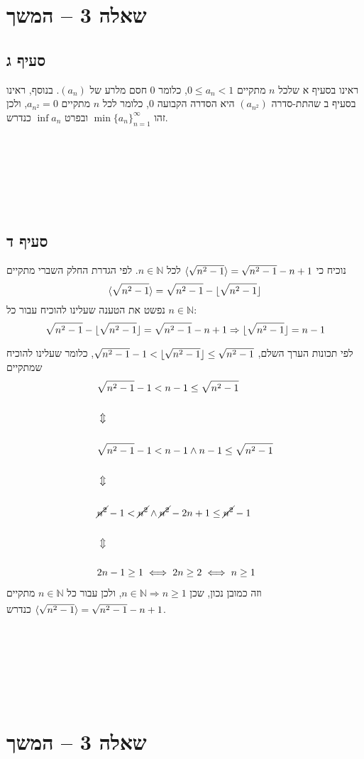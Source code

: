 \documentclass[11pt, oneside]{article}
\newcommand{\qed}{\R{$\blacksquare$}}
\newcommand{\br}{\\\\\\\\\\\\\\}
\newcommand{\logr}[1]{\underset{\text{#1}}{\Rightarrow}}
\newcommand{\mN}{\mathbb{N}}
\DeclarePairedDelimiter\floor{\lfloor}{\rfloor}
\DeclarePairedDelimiter\quo{\langle}{\rangle}
\begin{document}
\section*{שאלה 3 -- המשך}
\subsection*{סעיף ג}
ראינו בסעיף א שלכל $n$ מתקיים $0 \le a_{n} < 1$, כלומר 0 חסם מלרע של $(a_{n})$. בנוסף, ראינו בסעיף ב שהתת-סדרה $(a_{n^{2}})$ היא הסדרה הקבועה $0$, כלומר לכל $n$ מתקיים $a_{n^{2}} = 0$, ולכן זהו $\min{\{a_{n}\}^{\infty}_{n = 1}}$ ובפרט $\inf{a_{n}}$ כנדרש.
\br\qed

\subsection*{סעיף ד}
נוכיח כי $\quo{\sqrt{n^{2} - 1}} = \sqrt{n^{2} - 1} - n + 1$ לכל $n \in \mN$. לפי הגדרת החלק השברי מתקיים
\[\quo{\sqrt{n^{2} - 1}} = \sqrt{n^{2} - 1} - \floor{\sqrt{n^{2} - 1}}\]
נפשט את הטענה שעלינו להוכיח עבור כל $n \in \mN$:
\[
\sqrt{n^{2} - 1} - \floor{\sqrt{n^{2} - 1}} = \sqrt{n^{2} - 1} - n + 1 \logr{} \floor{\sqrt{n^{2} - 1}} = n - 1
\]
לפי תכונות הערך השלם, $\sqrt{n^{2} - 1} - 1 < \floor{\sqrt{n^{2} - 1}} \le \sqrt{n^{2} - 1}$, כלומר שעלינו להוכיח שמתקיים
\begin{eqnarray*}
& \sqrt{n^{2} - 1} - 1 < n - 1 \le \sqrt{n^{2} - 1}\\\\
& \Updownarrow\\\\
& \sqrt{n^{2} - 1} - 1 < n - 1 \land n - 1 \le \sqrt{n^{2} - 1}\\\\
& \Updownarrow\\\\
& \cancel{n^{2}} - 1 < \cancel{n^{2}} \land \cancel{n^{2}} - 2n + 1 \le \cancel{n^{2}} - 1\\\\
& \Updownarrow\\\\
& 2n - 1 \ge 1 \iff 2n \ge 2 \iff n \ge 1
\end{eqnarray*}
וזה כמובן נכון, שכן $n \in \mN \logr{} n \ge 1$, ולכן עבור כל $n \in \mN$ מתקיים $\quo{\sqrt{n^{2} - 1}} = \sqrt{n^{2} - 1} - n + 1$ כנדרש.
\br\qed
\clearpage

\section*{שאלה 3 -- המשך}
\end{document}

